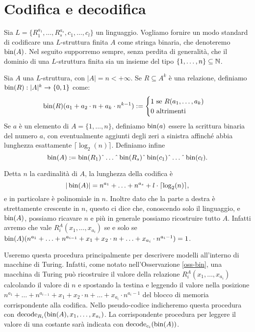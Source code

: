 
\section{Codifica e decodifica}
Sia $L=\{R^{a_1}_1, \ldots, R^{a_s}_s, c_1, \ldots, c_l\}$ un linguaggio.
Vogliamo fornire un modo standard di codificare una $L$-struttura finita $A$ come
stringa binaria, che denoteremo $\operatorname{bin}(A)$. Nel seguito supporremo sempre, senza
perdita di generalità, che
il dominio di una $L$-struttura finita sia un insieme del tipo
$\{1,\ldots,n\} \subseteq \mathbb{N}$.

\begin{definizione}
  Sia $A$ una $L$-struttura, con $|A| = n < +\infty$.
  Se $R \subseteq A^k$ è una relazione,
  definiamo $\operatorname{bin}(R): |A|^k \to \{0,1\}$ come:
  \[\operatorname{bin}(R)(a_1 + a_2 \cdot n + a_k \cdot n^{k-1}):=
    \begin{cases}
      1 \mbox{ se } R(a_1,\ldots,a_k) \\
      0 \mbox{ altrimenti}
    \end{cases}
  \]
  Se $a$ è un elemento di $A=\{1,\ldots,n\}$, definiamo $\operatorname{bin}(a)$ essere la
  scrittura binaria del numero $a$, con eventualmente aggiunti degli zeri a
  sinistra affinché abbia lunghezza esattamente $\lceil \log_2(n) \rceil$.
  Definiamo infine
  \[\bin(A):=\bin(R_1)\string^\ldots\string^\bin(R_s)\string^\bin(c_1)\string^\ldots\string^\bin(c_l).\]
\end{definizione}

\begin{osservazione}
\label{oss-bin}
 Detta $n$ la cardinalità di $A$, la lunghezza della codifica è
 \[ |\operatorname{bin}(A)|=n^{a_1} + \ldots + n^{a_s} + l \cdot \lceil \log_2(n) \rceil, \]
 e in particolare è polinomiale in $n$. Inoltre dato che la parte a destra è
 strettamente crescente in $n$, questo ci dice che, conoscendo solo il linguaggio,
 e $\operatorname{bin}(A)$, possiamo ricavare $n$ e più in generale possiamo ricostruire tutto $A$.
 Infatti avremo che vale $R_i^A(x_1,\ldots, x_{a_i})$ se e solo se
 $\operatorname{bin}(A)(n^{a_1} + \ldots + n^{a_{i-1}} + x_1 + x_2 \cdot n + \ldots + x_{a_i} \cdot n^{a_i-1}) = 1$.
\end{osservazione}
Useremo questa procedura principalmente per descrivere modelli all'interno
di macchine di Turing. Infatti, come notato nell'Osservazione \ref{oss-bin},
una macchina di Turing può ricostruire
il valore della relazione $R_i^A(x_1, \ldots, x_{a_i})$ calcolando il valore
di $n$ e spostando la testina e leggendo il valore nella posizione
$n^{a_1} + \ldots + n^{a_{i-1}} + x_1 + x_2 \cdot n + \ldots + x_{a_i} \cdot n^{a_i-1}$
del blocco di memoria corrispondente alla codifica.
Nello pseudo-codice indicheremo questa procedura con
$\operatorname{decode}_{R_i}(\operatorname{bin}(A), x_1, \ldots, x_{a_i})$. La corrispondente procedura per
leggere il valore di una costante sarà indicata con $\operatorname{decode}_{c_i} (\operatorname{bin}(A))$.

